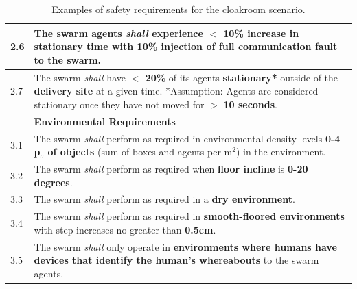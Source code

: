 \documentclass[runningheads]{llncs}
\begin{document}
\begin{table}[!t]
\begin{tabular}{p{5mm} p{116mm} }
		\hline
		2.6 & The swarm agents \emph{shall} experience $<$ \textbf{10\%} increase in \textbf{stationary time} with \textbf{10\% injection} of \textbf{full communication fault} to the swarm. \\	
		\hline
		2.7 & The swarm \emph{shall} have \textbf{$<$ 20\%} of its agents \textbf{stationary*} outside of the \textbf{delivery site} at a given time.
		*Assumption: Agents are considered stationary once they have not moved for $>$ \textbf{10 seconds}. \\
		\hline
		& \textbf{Environmental Requirements}\\
		\hline
		3.1 & The swarm \emph{shall} perform as required in environmental density levels \textbf{0-4 p$_o$ of objects} (sum of boxes and agents per m$^2$) in the environment. %
		\\ 
		\hline
		3.2 & The swarm \emph{shall} perform as required when \textbf{floor incline} is \textbf{0-20 degrees}.
		\\ 
		\hline
		3.3 & The swarm \emph{shall} perform as required in a \textbf{dry environment}.
		\\ 
		\hline
		3.4 & The swarm \emph{shall} perform as required in \textbf{smooth-floored environments} with step increases no greater than \textbf{0.5cm}.
		\\ 
		\hline
		3.5 & The swarm \emph{shall} only operate in \textbf{environments where humans have devices that identify the human’s whereabouts} to the swarm agents.
		\\		[1ex] 		
		\hline
	\end{tabular}
	\caption{\label{tab:reqs}Examples of safety requirements for the cloakroom scenario.}
	\vspace{-4ex}
\end{table}

\end{document}
